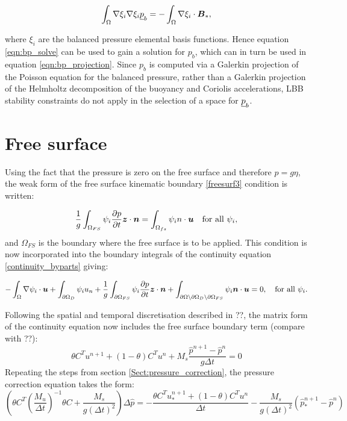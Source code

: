 \begin{equation}\label{eqn:bp_solve}
  \int_\Omega \nabla \xi_i \nabla \xi_i \underline{p}_b = - \int_\Omega \nabla \xi_i \cdot {\mbox{\boldmath$B$}}_*,
\end{equation}

where $\xi_i$ are the balanced pressure elemental basis functions. Hence equation
\eqref{eqn:bp_solve} can be used to gain a solution for $p_b$, which can in turn
be used in equation \eqref{eqn:bp_projection}. Since $p_b$ is computed via
a Galerkin projection of the Poisson equation for the balanced pressure,
rather than a Galerkin projection of the Helmholtz decomposition of the buoyancy
and Coriolis accelerations, LBB stability constraints do not apply in the selection
of a space for $\underline{p}_b$.

\section{Free surface}

Using the fact that the pressure is zero on the free surface and therefore $p=g\eta$, the weak form of the free surface kinematic boundary \eqref{freesurf3} condition is written:

\begin{equation}\label{weakfreesurf3}
\frac{1}{g} \int_{\Omega_{FS}} {\psi_i }\frac{\partial p}{\partial t}{\mbox{\boldmath$z$}} \cdot {\mbox{\boldmath$n$}}=\int_{\Omega_{fs}} \psi_i {n \cdot {\mbox{\boldmath$u$}}} \quad
  \text{for all } \psi_i,
\end{equation}
and $\Omega_{FS}$ is the boundary where the free surface is to be applied. This condition is now incorporated into the boundary integrals of the continuity equation \eqref{continuity_byparts} giving:

\begin{equation}\label{continuity_byparts_withfs}
  -\int_\Omega \nabla\psi_i \cdot {\mbox{\boldmath$u$}}
  + \int_{\partial\Omega_D} \psi_i u_n
  + \frac{1}{g} \int_{\partial\Omega_{FS}}  {\psi_i }\frac{\partial p}{\partial t}{\mbox{\boldmath$z$}} \cdot {\mbox{\boldmath$n$}}
  + \int_{\partial\Omega\setminus\partial\Omega_D\setminus\partial\Omega_{FS}} \psi_i{\mbox{\boldmath$n$}}\cdot {\mbox{\boldmath$u$}}
  = 0,\quad
  \text{for all } \psi_i.
\end{equation}

Following the spatial and temporal discretisation described in ??, the matrix form of the continuity equation now includes the free surface boundary term (compare with ??):
\begin{equation}
\theta C^T u^{n+1} + (1-\theta) C^T u^n + M_s \frac{\hat p^{n+1}-\hat p^n}{g \Delta t}=0
\end{equation}
Repeating the steps from section \ref{Sect:pressure_correction}, the pressure correction equation takes the form:
\begin{equation}
(\theta C^T(\frac{M_u}{\Delta t})^{-1} \theta C + \frac{M_s}{g(\Delta t)^2})\Delta \hat p = -\frac{\theta C^T u_*^{n+1} + (1-\theta)C^Tu^n}{\Delta t}-\frac{M_s}{g(\Delta t)^2}(\hat p_*^{n+1}-\hat p^n)
\end{equation}


